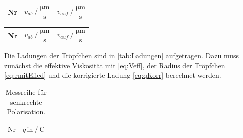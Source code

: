 \begin{table}[H]
\begin{minipage}[t]{0.45\textwidth}
\begin{table}[H]
\begin{tabular}{S S S}
            \bottomrule
          \end{tabular}
        \end{table}
      
  \end{minipage}\qquad
  \begin{minipage}[t]{0.45\textwidth}
      \small
      \label{stab:v225}
      \begin{table}[H]
          \centering
          \begin{tabular}{S S S}
            \toprule
              {Nr}& {$ v_{ab} \mathbin{/} \dfrac{\unit{\micro\meter}}{\unit{\second}}$}&{$ v_{auf} \mathbin{/} \dfrac{\unit{\micro\meter}}{\unit{\second}}$}\\
            \midrule
            
            \bottomrule
          \end{tabular}
        \end{table}
      
  \end{minipage}\qquad
  \begin{minipage}[t]{0.45\textwidth}
      \small
      \label{stab:v250}
      \begin{table}[H]
          \centering
          \begin{tabular}{S S S}
            \toprule
              {Nr}& {$ v_{ab} \mathbin{/} \dfrac{\unit{\micro\meter}}{\unit{\second}}$}&{$ v_{auf} \mathbin{/} \dfrac{\unit{\micro\meter}}{\unit{\second}}$}\\
            \midrule
            
            \bottomrule
          \end{tabular}
        \end{table}
  \end{minipage}
\end{table}

Die Ladungen der Tröpfchen sind in \autoref{tab:Ladungen} aufgetragen. Dazu muss zunächst die effektive Viskosität mit \eqref{eq:Veff}, der Radius der Tröpfchen \eqref{eq:rmitEfled} und die korrigierte Ladung \eqref{eq:qKorr} berechnet werden.

\begin{table}[H]
  \centering
  \caption{Messreihe für senkrechte Polarisation.}
  \label{tab:Ladungen}
  \begin{tabular}{S S}
    \toprule
      {$\text{Nr}$} & {$q \, \text{in} \mathbin{/} \unit{\coulomb}$}\\
    \midrule

    \bottomrule
  \end{tabular}
\end{table}

